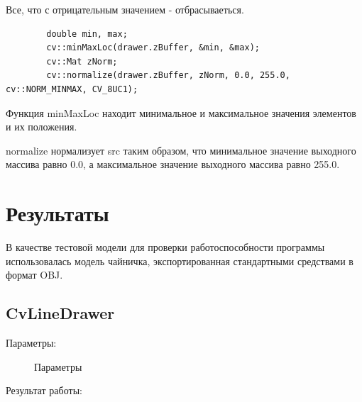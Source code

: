 \documentclass[14pt,a4paper,report]{report}
\begin{document}
Все, что с отрицательным значением - отбрасываеться.

\begin{lstlisting}
        double min, max;
        cv::minMaxLoc(drawer.zBuffer, &min, &max);
        cv::Mat zNorm;
        cv::normalize(drawer.zBuffer, zNorm, 0.0, 255.0, cv::NORM_MINMAX, CV_8UC1);
       \end{lstlisting}

Функция minMaxLoc находит минимальное и максимальное значения элементов и их положения. 

normalize нормализует src таким образом, что минимальное значение выходного массива равно 0.0, а максимальное значение выходного массива равно 255.0. 





\clearpage
\section{Результаты}
В качестве тестовой модели для проверки работоспособности программы использовалась модель чайничка, экспортированная стандартными средствами в формат OBJ.

 


\subsection{CvLineDrawer}
Параметры:

\begin{figure}[h!]
\caption{Параметры}
\label{ris:image}
\end{figure}

Результат работы: 
\end{document}
